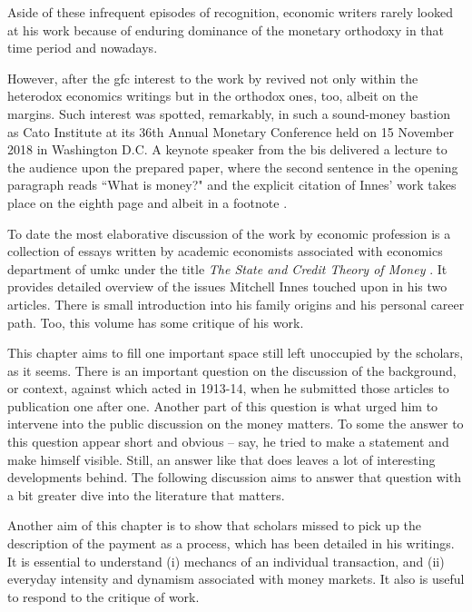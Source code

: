 Aside of these infrequent episodes of recognition, economic writers rarely looked at his work because of enduring dominance of the monetary orthodoxy in that time period and nowadays. 

However, after the \ac{gfc} interest to the work by \citeauthor{innes1913} revived not only within the heterodox economics writings but in the orthodox ones, too, albeit on the margins. Such interest was spotted, remarkably, in such a sound-money bastion as Cato Institute at its 36th Annual Monetary Conference held on 15 November 2018 in Washington D.C. A keynote speaker from the \ac{bis} delivered a lecture to the audience upon the prepared paper, where the second sentence in the opening paragraph reads ``What is money?" and the explicit citation of Innes' work takes place on the eighth page and albeit in a footnote \citep{borio2018}.

To date the most elaborative discussion of the \citeauthor{innes1913} work by economic profession is a collection of essays written by academic economists associated with economics department of \ac{umkc} under the title \textit{The State and Credit Theory of Money} \citep{wray2004}. It provides detailed overview of the issues Mitchell Innes touched upon in his two articles. There is small introduction into his family origins and his personal career path. Too, this volume has some critique of his work.

This chapter aims to fill one important space still left unoccupied by the \citeauthor{innes1913} scholars, as it seems. There is an important question on the discussion of the background, or context, against which \citeauthor{innes1913} acted in 1913-14, when he submitted those articles to publication one after one. Another part of this question is what urged him to intervene into the public discussion on the money matters. To some the answer to this question appear short and obvious -- say, he tried to make a statement and make himself visible. Still, an answer like that does leaves a lot of interesting developments behind. The following discussion aims to answer that question with a bit greater dive into the literature that matters. 

Another aim of this chapter is to show that \citeauthor{innes1913} scholars missed to pick up the description of the payment as a process, which has been detailed in his writings. It is essential to understand (i) mechancs of an individual transaction, and (ii) everyday intensity and dynamism associated with money markets. It also is useful to respond to the critique of  \citeauthor{innes1913} work.

